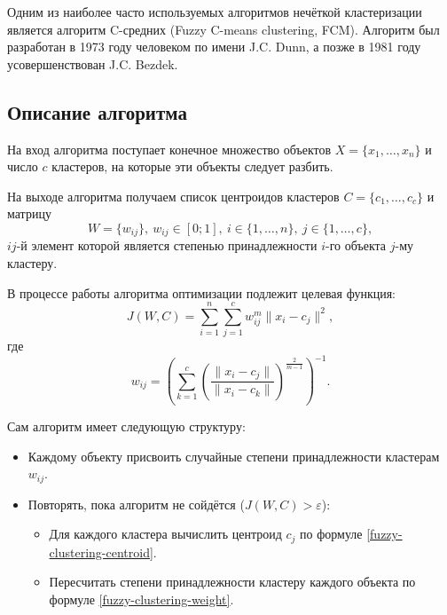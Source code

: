 Одним из наиболее часто используемых алгоритмов нечёткой кластеризации является алгоритм
C-средних (Fuzzy C-means clustering, FCM). Алгоритм был разработан в 1973 году человеком по имени
J.C. Dunn, а позже в 1981 году усовершенствован J.C. Bezdek.

\subsection{Описание алгоритма}

На вход алгоритма поступает конечное множество объектов $X = \{x_1, \ldots, x_n\}$ и число $c$
кластеров, на которые эти объекты следует разбить.

На выходе алгоритма получаем список центроидов кластеров $C = \{c_1, \ldots, c_c\}$ и матрицу
\begin{equation*}
    W = \{w_{ij}\},\ w_{ij} \in [0; 1],\ i \in \{1, \ldots, n\},\ j \in \{1, \ldots, c\},
\end{equation*}
$ij$-й элемент которой является степенью принадлежности $i$-го объекта $j$-му кластеру.

В процессе работы алгоритма оптимизации подлежит целевая функция:
\begin{equation*}
    J(W, C) = \sum\limits_{i = 1}^{n} \sum\limits_{j = 1}^{c} w_{ij}^{m} \lVert x_i - c_j \rVert^2,
\end{equation*}
где
\begin{equation}\label{fuzzy-clustering-weight}
    w_{ij} = \left(\sum\limits_{k = 1}^{c}
        \left(
            \frac{\lVert x_i - c_j \rVert}{\lVert x_i - c_k \rVert}
        \right)^{\frac{2}{m - 1}}
    \right)^{-1}.
\end{equation}

Сам алгоритм имеет следующую структуру:

\begin{itemize}
    \item Каждому объекту присвоить случайные степени принадлежности кластерам $w_{ij}$.
    \item Повторять, пока алгоритм не сойдётся ($J(W, C) > \varepsilon$):
    \begin{itemize}
        \item Для каждого кластера вычислить центроид $c_j$ по формуле
                \eqref{fuzzy-clustering-centroid}.
        \item Пересчитать степени принадлежности кластеру каждого объекта по формуле
                \eqref{fuzzy-clustering-weight}.
    \end{itemize}
\end{itemize}

